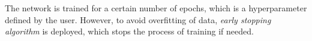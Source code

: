 The network is trained for a certain number of epochs, which is a hyperparameter defined by the user. However, to avoid overfitting of data, \textit{early stopping algorithm} is deployed, which stops the process of training if needed.  





















